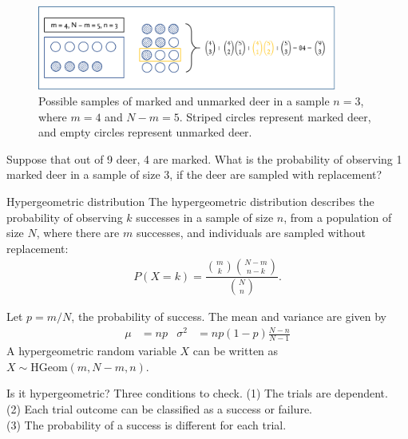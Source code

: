 \begin{figure}[h]
	\centering
	\includegraphics[width=0.880\textwidth]
	{ch_distributions_oi_biostat/figures/hGeomSchematic/hGeomSchematic.png}
	\caption{Possible samples of marked and unmarked deer in a sample $n = 3$, where $m = 4$ and $N - m = 5$. Striped circles represent marked deer, and empty circles represent unmarked deer.}
	\label{hGeomSchematic}
\end{figure}

\textD{\newpage}

\begin{exercisewrap}
\begin{nexercise}
Suppose that out of 9 deer, 4 are marked. What is the probability of observing 1 marked deer in a sample of size 3, if the deer are sampled with replacement?\footnotemark{}
\end{nexercise}
\end{exercisewrap}

\begin{onebox}{Hypergeometric distribution}
The hypergeometric distribution describes the probability of observing $k$ successes in a sample of size $n$, from a population of size $N$, where there are $m$ successes, and individuals are sampled without replacement:
\begin{align*}
P(X = k) = \dfrac{{m \choose k} {N - m \choose n-k}}{{N \choose n}}.
\label{hypergeometricEquation}
\end{align*}

Let $p = m/N$, the probability of success. The mean and variance are given by\vspace{-2.5mm}
\begin{align*}
\mu &= np
&\sigma^2&=np(1-p)\frac{N-n}{N-1}
\end{align*}
A hypergeometric random variable $X$ can be written as $X \sim \textrm{HGeom}(m, N-m, n)$.
\end{onebox}

\begin{onebox}{Is it hypergeometric? Three conditions to check.}
(1) The trials are dependent. \\
(2) Each trial outcome can be classified as a success or failure. \\
(3) The probability of a success is different for each trial.
\end{onebox}

